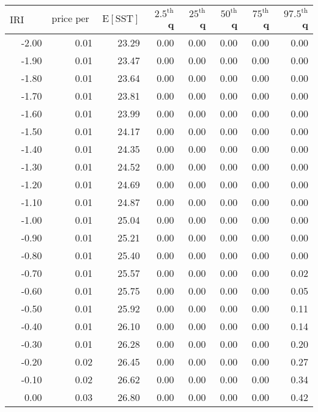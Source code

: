\begin{table*}[ht]
\centering \footnotesize
\begin{tabular}{rrrrrrrr}
  \hline
$\mbox{IRI anom}$ & $\mbox{price per USD}$ & $\mbox{E}[\mbox{SST}]$ & $2.5^{\mbox{th}}$ q & $25^{\mbox{th}}$ q & $50^{\mbox{th}}$ q & $75^{\mbox{th}}$ q & $97.5^{\mbox{th}}$ q \\ 
  \hline
-2.00 & 0.01 & 23.29 & 0.00 & 0.00 & 0.00 & 0.00 & 0.00 \\ 
  -1.90 & 0.01 & 23.47 & 0.00 & 0.00 & 0.00 & 0.00 & 0.00 \\ 
  -1.80 & 0.01 & 23.64 & 0.00 & 0.00 & 0.00 & 0.00 & 0.00 \\ 
  -1.70 & 0.01 & 23.81 & 0.00 & 0.00 & 0.00 & 0.00 & 0.00 \\ 
  -1.60 & 0.01 & 23.99 & 0.00 & 0.00 & 0.00 & 0.00 & 0.00 \\ 
  -1.50 & 0.01 & 24.17 & 0.00 & 0.00 & 0.00 & 0.00 & 0.00 \\ 
  -1.40 & 0.01 & 24.35 & 0.00 & 0.00 & 0.00 & 0.00 & 0.00 \\ 
  -1.30 & 0.01 & 24.52 & 0.00 & 0.00 & 0.00 & 0.00 & 0.00 \\ 
  -1.20 & 0.01 & 24.69 & 0.00 & 0.00 & 0.00 & 0.00 & 0.00 \\ 
  -1.10 & 0.01 & 24.87 & 0.00 & 0.00 & 0.00 & 0.00 & 0.00 \\ 
  -1.00 & 0.01 & 25.04 & 0.00 & 0.00 & 0.00 & 0.00 & 0.00 \\ 
  -0.90 & 0.01 & 25.21 & 0.00 & 0.00 & 0.00 & 0.00 & 0.00 \\ 
  -0.80 & 0.01 & 25.40 & 0.00 & 0.00 & 0.00 & 0.00 & 0.00 \\ 
  -0.70 & 0.01 & 25.57 & 0.00 & 0.00 & 0.00 & 0.00 & 0.02 \\ 
  -0.60 & 0.01 & 25.75 & 0.00 & 0.00 & 0.00 & 0.00 & 0.05 \\ 
  -0.50 & 0.01 & 25.92 & 0.00 & 0.00 & 0.00 & 0.00 & 0.11 \\ 
  -0.40 & 0.01 & 26.10 & 0.00 & 0.00 & 0.00 & 0.00 & 0.14 \\ 
  -0.30 & 0.01 & 26.28 & 0.00 & 0.00 & 0.00 & 0.00 & 0.20 \\ 
  -0.20 & 0.02 & 26.45 & 0.00 & 0.00 & 0.00 & 0.00 & 0.27 \\ 
  -0.10 & 0.02 & 26.62 & 0.00 & 0.00 & 0.00 & 0.00 & 0.34 \\ 
  0.00 & 0.03 & 26.80 & 0.00 & 0.00 & 0.00 & 0.00 & 0.42 \\ 

\end{tabular}
\end{table*}
